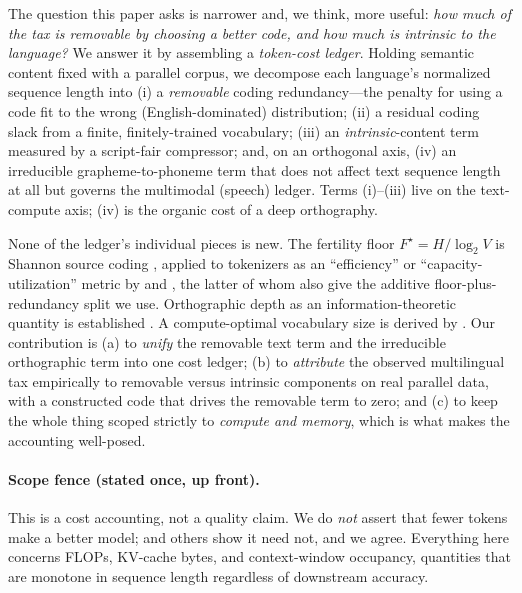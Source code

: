 \documentclass[11pt]{article}
\begin{document}
The question this paper asks is narrower and, we think, more useful: \emph{how much of the tax is
removable by choosing a better code, and how much is intrinsic to the language?} We answer it by
assembling a \emph{token-cost ledger}. Holding semantic content fixed with a parallel corpus, we
decompose each language's normalized sequence length into (i) a \emph{removable} coding redundancy---the
penalty for using a code fit to the wrong (English-dominated) distribution; (ii) a residual coding slack
from a finite, finitely-trained vocabulary; (iii) an \emph{intrinsic}-content term measured by a
script-fair compressor; and, on an orthogonal axis, (iv) an irreducible grapheme-to-phoneme term that
does not affect text sequence length at all but governs the multimodal (speech) ledger. Terms (i)--(iii)
live on the text-compute axis; (iv) is the organic cost of a deep orthography.

None of the ledger's individual pieces is new. The fertility floor $F^\star=H/\log_2 V$ is Shannon
source coding \citep{shannon1948mathematical, cover2006elements}, applied to tokenizers as an
``efficiency'' or ``capacity-utilization'' metric by \citet{zouhar2023noiseless} and
\citet{erdogan2026infotok}, the latter of whom also give the additive floor-plus-redundancy split we
use. Orthographic depth as an information-theoretic quantity is established
\citep{torres2025orthography}. A compute-optimal vocabulary size is derived by
\citet{tao2024vocabulary}. Our contribution is (a) to \emph{unify} the removable text term and the
irreducible orthographic term into one cost ledger; (b) to \emph{attribute} the observed multilingual
tax empirically to removable versus intrinsic components on real parallel data, with a constructed code
that drives the removable term to zero; and (c) to keep the whole thing scoped strictly to
\emph{compute and memory}, which is what makes the accounting well-posed.

\paragraph{Scope fence (stated once, up front).} This is a cost accounting, not a quality claim. We do
\emph{not} assert that fewer tokens make a better model; \citet{schmidt2024morethan} and others show it
need not, and we agree. Everything here concerns FLOPs, KV-cache bytes, and context-window occupancy,
quantities that are monotone in sequence length regardless of downstream accuracy.
\end{document}
